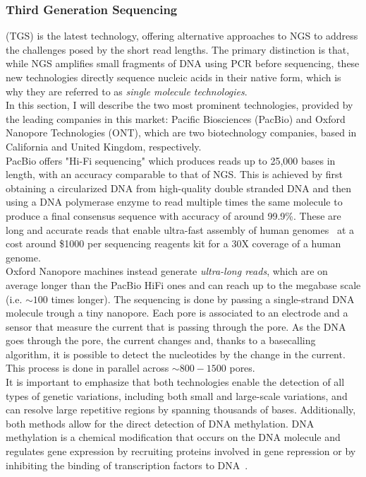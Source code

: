 \subsubsection{Third Generation Sequencing} (\gls{TGS}) is the latest technology, offering alternative approaches to NGS to address the challenges posed by the short read lengths. The primary distinction is that, while NGS amplifies small fragments of DNA using \gls{PCR} before sequencing, these new technologies directly sequence nucleic acids in their native form, which is why they are referred to as \emph{single molecule technologies}.\\
In this section, I will describe the two most prominent technologies, provided by the leading companies in this market: Pacific Biosciences (PacBio) and Oxford Nanopore Technologies (\gls{ONT}), which are two biotechnology companies, based in California and United Kingdom, respectively. \\
PacBio offers "Hi-Fi sequencing" which produces reads up to 25,000 bases in length, with an accuracy comparable to that of NGS. This is achieved by first obtaining a circularized DNA from high-quality double stranded DNA and then using a DNA polymerase enzyme to read multiple times the same molecule to produce a final consensus sequence with accuracy of around 99.9\%. These are long and accurate reads that enable ultra-fast assembly of human genomes~\cite{mdbg} at a cost around \$1000 per sequencing reagents kit for a 30X coverage of a human genome. \\
Oxford Nanopore machines instead generate \emph{ultra-long reads}, which are on average longer than the PacBio HiFi ones and can reach up to the megabase scale (i.e. $\sim100$ times longer). The sequencing is done by passing a single-strand DNA molecule trough a tiny nanopore. Each pore is associated to an electrode and a sensor that measure the current that is passing through the pore. As the DNA goes through the pore, the current changes and, thanks to a basecalling algorithm, it is possible to detect the nucleotides by the change in the current. This process is done in parallel across $\sim800-1500$ pores.\\
It is important to emphasize that both technologies enable the detection of all types of genetic variations, including both small and large-scale variations, and can resolve large repetitive regions by spanning thousands of bases. Additionally, both methods allow for the direct detection of DNA methylation. DNA methylation is a chemical modification that occurs on the DNA molecule and regulates gene expression by recruiting proteins involved in gene repression or by inhibiting the binding of transcription factors to DNA~\cite{methylation}. \\
